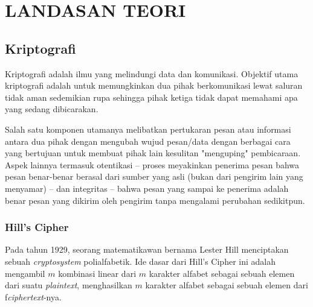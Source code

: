 \chapter{LANDASAN TEORI}

%
\vspace{12pt}


\section{Kriptografi}
Kriptografi adalah ilmu yang melindungi data dan komunikasi. Objektif utama
kriptografi adalah untuk memungkinkan dua pihak berkomunikasi lewat saluran
tidak aman sedemikian rupa sehingga pihak ketiga tidak dapat memahami apa yang
sedang dibicarakan.\par
Salah satu komponen utamanya melibatkan pertukaran pesan atau informasi antara
dua pihak dengan mengubah wujud pesan/data dengan berbagai cara yang bertujuan
untuk membuat pihak lain kesulitan "menguping" pembicaraan. Aspek lainnya
termasuk otentikasi -- proses meyakinkan penerima pesan bahwa pesan benar-benar
berasal dari sumber yang asli (bukan dari pengirim lain yang menyamar) -- dan
integritas -- bahwa pesan yang sampai ke penerima adalah benar pesan yang
dikirim oleh pengirim tanpa mengalami perubahan sedikitpun.

\subsection{Hill's Cipher}
Pada tahun 1929, seorang matematikawan bernama Lester Hill menciptakan sebuah 
\textit{cryptosystem} polialfabetik. Ide dasar dari Hill's Cipher ini adalah mengambil 
$m$ kombinasi linear dari $m$ karakter alfabet sebagai sebuah elemen dari suatu 
\emph{plaintext}, menghasilkan $m$ karakter alfabet sebagai sebuah elemen dari 
f\emph{ciphertext}-nya.


